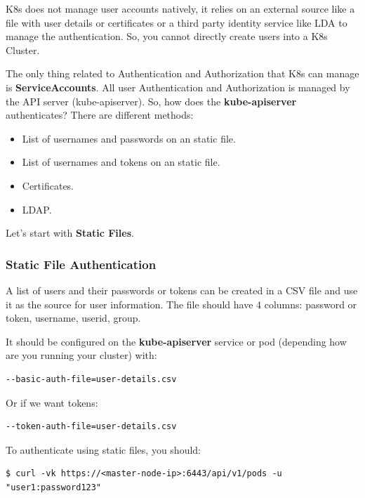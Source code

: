 \documentclass{article}
\newenvironment{codetemplate}[1][]{%
  \mybasecolorbox[#1]
  \itshape
}{%
  \endmybasecolorbox
}
\begin{document}
K8s does not manage user accounts natively, it relies on an external source like a file with user details or certificates or a third party identity service like LDA to manage the authentication. So, you cannot directly create users into a K8s Cluster.

The only thing related to Authentication and Authorization that K8s can manage is \textbf{ServiceAccounts}. All user Authentication and Authorization is managed by the API server (kube-apiserver). So, how does the \textbf{kube-apiserver} authenticates? There are different methods:

\begin{itemize}
    \item List of usernames and passwords on an static file.
    \item List of usernames and tokens on an static file.
    \item Certificates.
    \item LDAP.
\end{itemize}

Let's start with \textbf{Static Files}.

\subsubsection{Static File Authentication}
A list of users and their passwords or tokens can be created in a CSV file and use it as the source for user information.
The file should have 4 columns: password or token, username, userid, group.

It should be configured on the \textbf{kube-apiserver} service or pod (depending how are you running your cluster) with:
\begin{codetemplate}{}
\begin{verbatim}
--basic-auth-file=user-details.csv
\end{verbatim}
\end{codetemplate}

Or if we want tokens:
\begin{codetemplate}{}
\begin{verbatim}
--token-auth-file=user-details.csv
\end{verbatim}
\end{codetemplate}

To authenticate using static files, you should:
\begin{codetemplate}{}
\begin{verbatim}
$ curl -vk https://<master-node-ip>:6443/api/v1/pods -u "user1:password123"
\end{verbatim}
\end{codetemplate}
\end{document}
